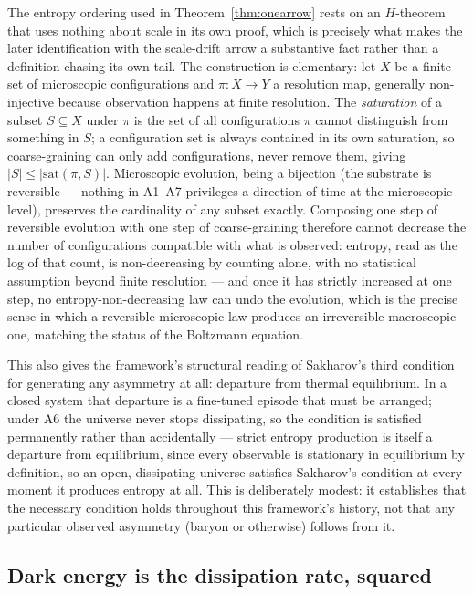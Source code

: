\documentclass[pdflatex,sn-mathphys-num]{sn-jnl}
\theoremstyle{thmstyleone}
\theoremstyle{thmstylethree}
\theoremstyle{thmstyletwo}
\begin{document}
The entropy ordering used in Theorem~\ref{thm:onearrow} rests on an
$H$-theorem that uses nothing about scale in its own proof, which is
precisely what makes the later identification with the scale-drift
arrow a substantive fact rather than a definition chasing its own tail.
The construction is elementary: let $X$ be a finite set of
microscopic configurations and $\pi:X\to Y$ a resolution map, generally
non-injective because observation happens at finite resolution. The
\emph{saturation} of a subset $S\subseteq X$ under $\pi$ is the set of
all configurations $\pi$ cannot distinguish from something in $S$; a
configuration set is always contained in its own saturation, so
coarse-graining can only add configurations, never remove them, giving
$|S|\le|\mathrm{sat}(\pi,S)|$. Microscopic evolution, being a bijection
(the substrate is reversible — nothing in A1–A7 privileges a direction of
time at the microscopic level), preserves the cardinality of any subset
exactly. Composing one step of reversible evolution with one step of
coarse-graining therefore cannot decrease the number of configurations
compatible with what is observed: entropy, read as the log of that
count, is non-decreasing by counting alone, with no statistical
assumption beyond finite resolution — and once it has strictly increased
at one step, no entropy-non-decreasing law can undo the evolution,
which is the precise sense in which a reversible microscopic law
produces an irreversible macroscopic one, matching the status of the
Boltzmann equation.

This also gives the framework's structural reading of Sakharov's third
condition for generating any asymmetry at all: departure from thermal
equilibrium. In a closed system that departure is a fine-tuned episode
that must be arranged; under A6 the universe never stops dissipating,
so the condition is satisfied permanently rather than accidentally —
strict entropy production is itself a departure from equilibrium, since
every observable is stationary in equilibrium by definition, so an open,
dissipating universe satisfies Sakharov's condition at every moment it
produces entropy at all. This is deliberately modest: it establishes
that the necessary condition holds throughout this framework's history,
not that any particular observed asymmetry (baryon or otherwise) follows
from it.

\subsection{Dark energy is the dissipation rate, squared}
\end{document}

